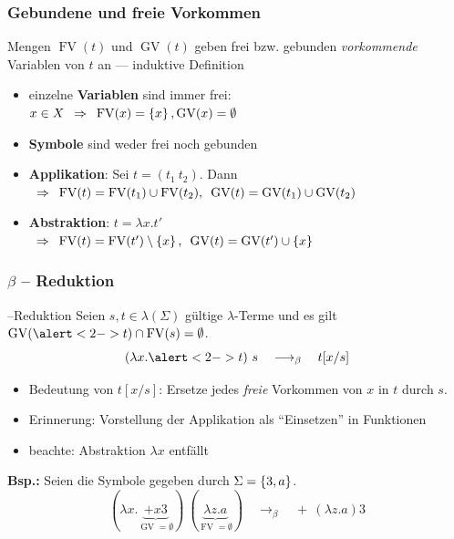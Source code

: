 \documentclass{beamer}
\DeclareMathOperator{\GV}{GV}
\DeclareMathOperator{\FV}{FV}
\begin{document}
\begin{frame} \frametitle{Gebundene und freie Vorkommen}
	\footnotesize
	Mengen $\FV(t)$ und $\GV(t)$ geben frei bzw. gebunden \textit{vorkommende} Variablen von $t$ an --- induktive Definition
	
	\pause
	
	\begin{itemize}[<+->]
		\item einzelne \textbf{Variablen} sind immer frei: \\
		$x \in X \follows \FV(x) = \menge{x} , \GV(x) = \emptyset$
		\item \textbf{Symbole} sind weder frei noch gebunden
		\item \textbf{Applikation}: Sei $t = (t_1 \  t_2)$. Dann \\
		$\follows 
		\FV(t) = \FV(t_1) \cup \FV(t_2) , \enskip
		\GV(t) = \GV(t_1) \cup \GV(t_2)$
		\item \textbf{Abstraktion}: $t = \lambda x . t'$ \\
		$\follows 
		\FV(t) = \FV(t') \setminus \menge{x} , \enskip
		\GV(t) = \GV(t') \cup \menge{x}$
	\end{itemize}
\end{frame}

\begin{frame} \frametitle{$\beta$ -- Reduktion}
	\footnotesize
	\begin{block}{\textbeta--Reduktion}
		Seien $s,t \in \lambda(\Sigma)$ gültige $\lambda$-Terme und es gilt $\GV(\alert<2->{t}) \cap \FV(s) = \emptyset$. 
		\begin{equation*}
			(\lambda x . \alert<2->{t}) \ s \quad \longrightarrow_\beta \quad t[x / s]
		\end{equation*}
	\end{block}
	
	\pause
	
	\begin{itemize}
		\item Bedeutung von $t[x / s]$: Ersetze jedes \textit{freie} Vorkommen von $x$ in $t$ durch $s$. 
		\item Erinnerung: Vorstellung der Applikation als \enquote{Einsetzen} in Funktionen
		\item beachte: Abstraktion $\lambda x$ entfällt
	\end{itemize}

	\pause
	
	\textbf{Bsp.:} Seien die Symbole gegeben durch $\Sigma = \left\{ 3,a \right\}$.
	\begin{equation*}
		(\lambda x . \underbrace{+ x 3}_{\GV = \emptyset}) \ (\underbrace{\lambda z . a}_{\FV = \emptyset}) \quad \longrightarrow_\beta \quad + \ (\lambda z . a) 3
	\end{equation*}
\end{frame}
\end{document}

